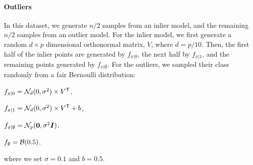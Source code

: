 \documentclass[10pt]{article}
\begin{document}










\paragraph*{Outliers} In this dataset, we generate $n/2$ samples from an inlier model, and the remaining $n/2$ samples from an outlier model.  For the inlier model, we first generate a random $d \times p$ dimensional orthonormal matrix, $V$, where $d=p/10$.  Then, the first half of the inlier points are generated by $f_{x|0}$, the next half by $f_{x|1}$, and the remaining points generated by $f_{x | \emptyset}$. For the outliers, we sampled their class randomly from a fair Bernoulli distribution:   
\begin{compactitem}
\item $f_{x|0} = \mathcal{N}_d(0,\sigma^2) \times V^{\mathsf{T}}$,
\item $f_{x|1} = \mathcal{N}_d(0,\sigma^2) \times V^{\mathsf{T}} + b$,
\item $f_{x|\emptyset} = \mathcal{N}_p(\boldsymbol{0},\sigma^2\boldsymbol{I})$,
\item $f_{\emptyset} = \mathcal{B}(0.5)$.
\end{compactitem}
where we set $\sigma=0.1$ and $b=0.5$.  






\clearpage
\end{document}
